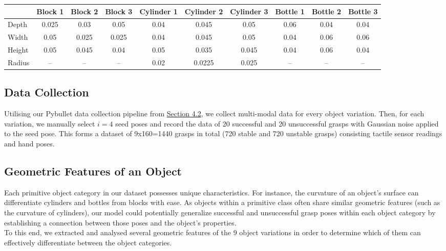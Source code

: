 \documentclass[12pt, a4paper]{report}
\theoremstyle{definition}
\begin{document}
\begin{table}[H]
{\begin{tabular}{lccccccccc}
            & Block 1 & Block 2 & Block 3 & Cylinder 1 & Cylinder 2 & Cylinder 3 & Bottle 1 & Bottle 2 & Bottle 3 \\
            \midrule
            Depth  & 0.025 & 0.03  & 0.05  & 0.04 & 0.045  & 0.05  & 0.06 & 0.04 & 0.04 \\
            Width  & 0.05  & 0.025 & 0.025 & 0.04 & 0.045  & 0.05  & 0.04 & 0.06 & 0.06 \\
            Height & 0.05  & 0.045 & 0.04  & 0.05 & 0.035  & 0.045 & 0.04 & 0.06 & 0.04 \\
            Radius & --    & --    & --    & 0.02 & 0.0225 & 0.025 & --   & --   & --   \\
            \bottomrule
        \end{tabular}
    }
    \label{tbl:5.1}
\end{table}


\subsection{Data Collection}
\label{sec:5.2.2}
Utilising our Pybullet data collection pipeline from \hyperref[sec:4.2]{Section 4.2}, we collect multi-modal data for every object variation. Then, for each variation, we manually select $i=4$ seed poses and record the data of 20 successful and 20 unsuccessful grasps with Gaussian noise applied to the seed pose. This forms a dataset of 9x160=1440 grasps in total (720 stable and 720 unstable grasps) consisting tactile sensor readings and hand poses.


\subsection{Geometric Features of an Object}
\label{sec:5.2.3}
Each primitive object category in our dataset possesses unique characteristics. For instance, the curvature of an object's surface can differentiate cylinders and bottles from blocks with ease. As objects within a primitive class often share similar geometric features (such as the curvature of cylinders), our model could potentially generalize successful and unsuccessful grasp poses within each object category by establishing a connection between those poses and the object's properties.\\

To this end, we extracted and analysed several geometric features of the 9 object variations in order to determine which of them can effectively differentiate between the object categories.
\end{document}
